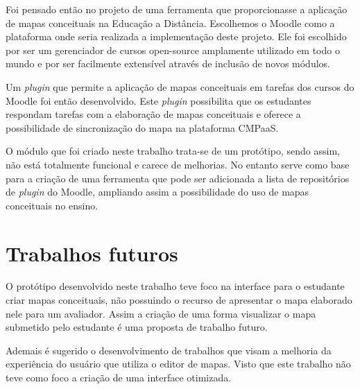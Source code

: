 \documentclass[
	12pt,				%
	openright,			%
	oneside,			%
	a4paper,			%
	english,			%
	french,				%
	spanish,			%
	brazil				%
	]{abntex2}
\begin{document}
Foi pensado então no projeto de uma ferramenta que proporcionasse a aplicação de mapas conceituais na Educação a Distância. Escolhemos o Moodle como a plataforma onde seria realizada a implementação deste projeto. Ele foi escolhido por ser um gerenciador de cursos open-source amplamente utilizado em todo o mundo e por ser facilmente extensível através de inclusão de novos módulos.

Um \textit{plugin} que permite a aplicação de mapas conceituais em tarefas dos cursos do Moodle foi então desenvolvido. Este \textit{plugin} possibilita que os estudantes respondam tarefas com a elaboração de mapas conceituais e oferece a possibilidade de sincronização do mapa na plataforma CMPaaS. 

O módulo que foi criado neste trabalho trata-se de um protótipo, sendo assim, não está totalmente funcional e carece de melhorias. No entanto serve como base para a criação de uma ferramenta que pode ser adicionada a lista de repositórios de \textit{plugin} do Moodle, ampliando assim a possibilidade do uso de mapas conceituais no ensino.         

\section{Trabalhos futuros}

O protótipo desenvolvido neste trabalho teve foco na interface para o estudante criar mapas conceituais, não possuindo o recurso de apresentar o mapa elaborado nele para um avaliador. Assim a criação de uma forma visualizar o mapa submetido pelo estudante é uma proposta de trabalho futuro. 

Ademais é sugerido o desenvolvimento de trabalhos que visam a melhoria da experiência do usuário que utiliza o editor de mapas. Visto que este trabalho não teve como foco a criação de uma interface otimizada.

\postextual



%
%
\end{document}
